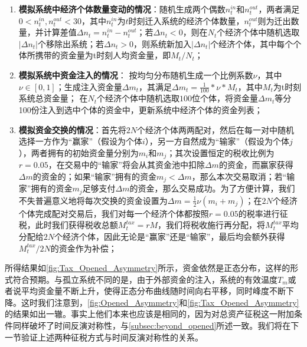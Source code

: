 \documentclass[tsinghuacite]{HustGraduPaper}
\begin{document}
		
		\begin{enumerate}[label=(\roman*)]
		
			\item {\bfseries 模拟系统中经济个体数量变动的情况}：随机生成两个偶数$n_{t}^{in}$和$n_{t}^{out}$，两者满足$0<n_{t}^{in}, n_{t}^{out}<30$，其中$n_{t}^{in}$为$t$时刻迁入系统的经济个体数量，$n_{t}^{out}$则为迁出数量，并计算差值$\Delta n_{t} = n_{t}^{in} - n_{t}^{out}$；若$\Delta n_{t} < 0$，则在$N_t$个经济个体中随机选取$ \lvert \Delta n_{t} \rvert $个移除出系统；若$\Delta n_{t} > 0$，则系统新加入$\lvert \Delta n_{t} \rvert $个经济个体，其中每个个体所携带的资金量为t时刻人均资金量，即$M_t / N_t$；

			
			\item {\bfseries 模拟系统中资金注入的情况}： 按均匀分布随机生成一个比例系数$\nu$，其中$\nu \in [0,1]$；生成注入资金量$\Delta m_t$，其满足$\Delta m_t =  \frac{1}{100} * \nu * M_t $，其中$M_t$为t时刻系统总资金量； 在$N_t$个经济个体中随机选取$100$位个体，将资金量$\Delta m_t$等分100份注入到选中个体的资金中，更新系统中经济个体的资金列表；
				
			
			\item {\bfseries 模拟资金交换的情况}：首先将$2N$个经济个体两两配对，然后在每一对中随机选择一方作为“赢家”（假设为个体$i$），另一方自然成为“输家”（假设为个体$j$），两者拥有的初始资金量分别为$m_i$和$m_j$；其次设置恒定的税收比例为$r=0.05$，在交易中的“输家”将会从其资金池中扣除$\Delta m$的资金，而赢家获得$\Delta m$的资金的；如果“输家”拥有的资金$m_{j} < \Delta m$，那么本次交易取消；若“输家”拥有的资金$m_j$足够支付$\Delta m$的资金，那么交易成功。为了方便计算，我们不失普遍意义地将每次交换的资金设置为$\Delta m =  \frac{1}{2} \nu (m_i + m_j)$；在$2N$个经济个体完成配对交易后，我们对每一个经济个体都按照$r=0.05$的税率进行征税，此时我们获得税收总额$M_t^{tax} = r M$，我们将税收施行再分配，将$M_t^{tax}$平均分配给$2N$个经济个体，因此无论是“赢家”还是“输家”，最后均会额外获得$M_t^{tax}/2N$的资金作为补偿；
			
		\end{enumerate}
		
	

		所得结果如\autoref{fig:Tax_Opened_Asymmetry}所示，资金依然是正态分布，这样的形式符合预期。与孤立系统不同的是，由于外部资金的注入，系统的有效温度$T_m$或者说平均资金量不断上升，使得正态分布曲线随时间向右平移，同时峰度不断下降。这时我们注意到，\autoref{fig:Opened_Asymmetry}和\autoref{fig:Tax_Opened_Asymmetry}的结果如出一辙。事实上他们本来也应该是相同的，因为对总资产征税这一附加条件同样破坏了时间反演对称性，与\autoref{subsec:beyond_opened}所述一致。我们将在下一节验证上述两种征税方式与时间反演对称性的关系。
	
\end{document}
